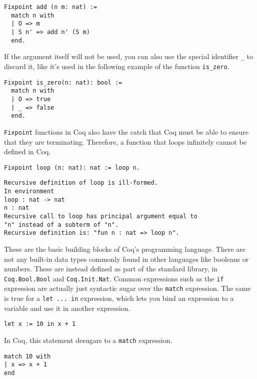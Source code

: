 \begin{verbatim}
Fixpoint add (n m: nat) :=
  match n with
  | O => m
  | S n' => add n' (S m)
  end.
\end{verbatim}

If the argument itself will not be used, you can also use the special
identifier \texttt{_} to discard it, like it's used in the following example 
of the function \texttt{is_zero}.

\begin{verbatim}
Fixpoint is_zero(n: nat): bool :=
  match n with
  | O => true
  | _ => false
  end.
\end{verbatim}


\texttt{Fixpoint} functions in Coq also have the catch that Coq must be able to ensure that
they are terminating. Therefore, a function that loops infinitely cannot be defined in Coq. 

\begin{verbatim}
Fixpoint loop (n: nat): nat := loop n.
\end{verbatim}
\vspace{-\baselineskip*3/2}
\begin{verbatim}
Recursive definition of loop is ill-formed.
In environment
loop : nat -> nat
n : nat
Recursive call to loop has principal argument equal to 
"n" instead of a subterm of "n".
Recursive definition is: "fun n : nat => loop n".
\end{verbatim}

These are the basic building blocks of Coq's programming language. There are not any built-in data 
types commonly found in other languages like booleans or numbers. These are instead defined as part of 
the standard library, in \texttt{Coq.Bool.Bool} and \texttt{Coq.Init.Nat}. Common 
expressions such as the \texttt{if} expression are actually just syntactic sugar over the
\texttt{match} expression. The same is true for a \texttt{let ... in} expression, 
which lets you bind an expression to a variable and use it in another expression.
\begin{verbatim}
let x := 10 in x + 1
\end{verbatim}
\noindent In Coq, this statement desugars to a \texttt{match} expression.
\begin{verbatim}
match 10 with
| x => x + 1
end
\end{verbatim}


